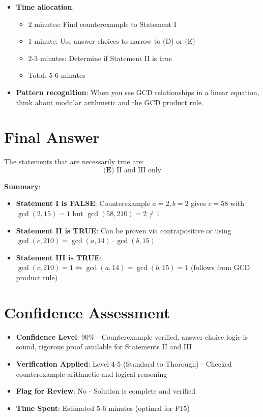 \documentclass[12pt]{article}
\begin{document}
\begin{tipbox}
\begin{itemize}
    \item \textbf{Time allocation}: 
    \begin{itemize}
        \item 2 minutes: Find counterexample to Statement I
        \item 1 minute: Use answer choices to narrow to (D) or (E)
        \item 2-3 minutes: Determine if Statement II is true
        \item Total: 5-6 minutes
    \end{itemize}
    
    \item \textbf{Pattern recognition}: When you see GCD relationships in a linear equation, think about modular arithmetic and the GCD product rule.
\end{itemize}
\end{tipbox}

\section*{Final Answer}

The statements that are necessarily true are:
$$\boxed{\textbf{(E) } \text{II and III only}}$$

\textbf{Summary}:
\begin{itemize}
    \item \textbf{Statement I is FALSE}: Counterexample $a=2, b=2$ gives $c=58$ with $\gcd(2,15)=1$ but $\gcd(58,210)=2 \neq 1$
    \item \textbf{Statement II is TRUE}: Can be proven via contrapositive or using $\gcd(c,210)=\gcd(a,14) \cdot \gcd(b,15)$
    \item \textbf{Statement III is TRUE}: $\gcd(c,210)=1 \Leftrightarrow \gcd(a,14)=\gcd(b,15)=1$ (follows from GCD product rule)
\end{itemize}

\section*{Confidence Assessment}
\begin{itemize}[leftmargin=*]
    \item \textbf{Confidence Level}: 90\% - Counterexample verified, answer choice logic is sound, rigorous proof available for Statements II and III
    \item \textbf{Verification Applied}: Level 4-5 (Standard to Thorough) - Checked counterexample arithmetic and logical reasoning
    \item \textbf{Flag for Review}: No - Solution is complete and verified
    \item \textbf{Time Spent}: Estimated 5-6 minutes (optimal for P15)
\end{itemize}
\end{document}
